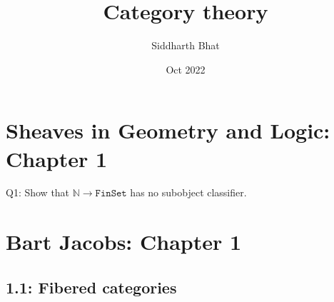 \documentclass[14pt]{report}
\title{Category theory}
\author{Siddharth Bhat}
\date{Oct 2022}
\newcommand{\N}{\ensuremath{\mathbb{N}}}
\newcommand{\FinSet}{\texttt{FinSet}}
\begin{document}
\maketitle
\tableofcontents
\chapter{Sheaves in Geometry and Logic: Chapter 1}
\begin{question}
    Q1: Show that $\N \to \FinSet$ has no subobject classifier.
\end{question}
\begin{answer}
\end{answer}
\chapter{Bart Jacobs: Chapter 1}
\section{1.1: Fibered categories}
\end{document}
